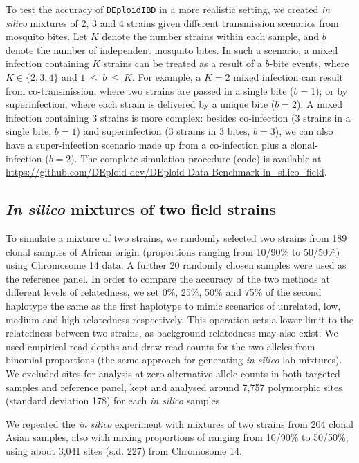 \documentclass[9pt]{article}
\begin{document}
\vspace{.5cm}
To test the accuracy of \texttt{DEploidIBD} in a more realistic setting, we created {\it in silico} mixtures of 2, 3 and 4 strains given different transmission scenarios from mosquito bites. Let $K$ denote the number strains within each sample, and $b$ denote the number of independent mosquito bites. In such a scenario, a mixed infection containing $K$ strains can be treated as a result of a $b$-bite events, where $K \in \{2,3,4\}$ and $1~{\leq}~{b}~{\leq}~K$. For example, a $K=2$ mixed infection can result from co-transmission, where two strains are passed in a single bite ($b=1$); or by superinfection, where each strain is delivered by a unique bite ($b=2$). A mixed infection containing 3 strains is more complex: besides co-infection (3 strains in a single bite, $b=1$) and superinfection (3 strains in 3 bites, $b=3$), we can also have a super-infection scenario made up from a co-infection plus a clonal-infection ($b=2$). The complete simulation procedure (code) is available at \url{https://github.com/DEploid-dev/DEploid-Data-Benchmark-in_silico_field}.

\subsection{{\it In silico} mixtures of two field strains}
To simulate a mixture of two strains, we randomly selected two strains from 189 clonal samples of African origin (proportions ranging from 10/90\% to 50/50\%) using Chromosome 14 data.  A further 20 randomly chosen samples were used as the reference panel. In order to compare the accuracy of the two methods at different levels of relatedness, we set 0\%, 25\%, 50\% and 75\% of the second haplotype the same as the first haplotype to mimic scenarios of unrelated, low, medium and high relatedness respectively. This operation sets a lower limit to the relatedness between two strains, as background relatedness may also exist. We used empirical read depths and drew read counts for the two alleles from binomial proportions (the same approach for generating {\it in silico} lab mixtures). We excluded sites for analysis at zero alternative allele counts in both targeted samples and reference panel, kept and analysed around 7,757 polymorphic sites (standard deviation 178) for each {\it in silico} samples.

We repeated the \emph{in silico} experiment with mixtures of two strains from 204 clonal Asian samples, also with mixing proportions of ranging from 10/90\% to 50/50\%, using about 3,041 sites (s.d. 227) from Chromosome 14.
\end{document}
